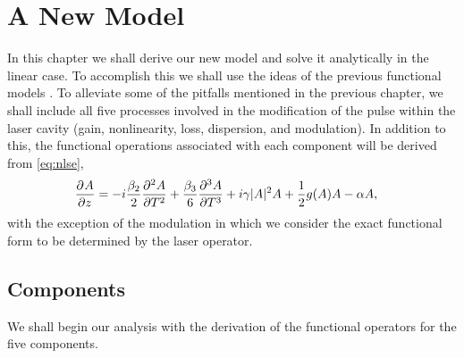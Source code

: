 
\chapter{A New Model}
\label{chap:linear}
In this chapter we shall derive our new model and solve it analytically in the linear case. To accomplish this we shall use the ideas of the previous functional models \cite{cutler, seigman, kuizenga1970a, kuizenga1970b, kuizenga1970, martinez1984, martinez1985, burgoyne2014}. To alleviate some of the pitfalls mentioned in the previous chapter, we shall include all five processes involved in the modification of the pulse within the laser cavity (gain, nonlinearity, loss, dispersion, and modulation). In addition to this, the functional operations associated with each component will be derived from \eqref{eq:nlse},
\begin{align*}
\pdiff{A}{z} &= - i \frac{\beta_2}{2}\pdiff[2]{A}{T} + \frac{\beta_3}{6}\pdiff[3]{A}{T} + i \gamma |A|^2 A + \frac{1}{2}g(A) A - \alpha A,
\end{align*}
with the exception of the modulation in which we consider the exact functional form to be determined by the laser operator. \\

\section{Components}
We shall begin our analysis with the derivation of the functional operators for the five components. \\

